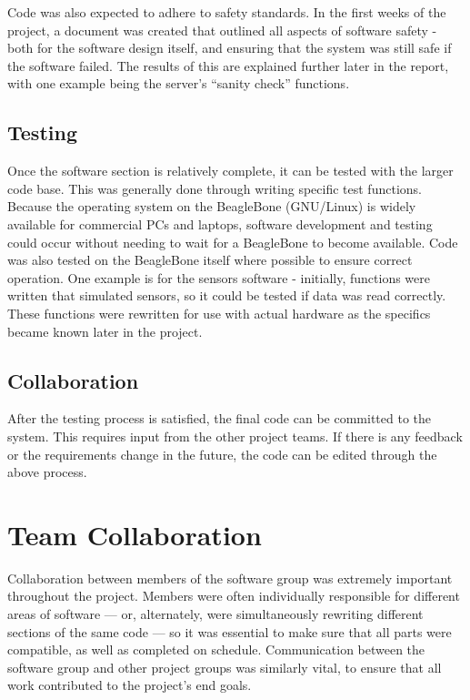 Code was also expected to adhere to safety standards. In the first weeks of the project, a document\cite{kruger_safety} was created that outlined all aspects of software safety - both for the software design itself, and ensuring that the system was still safe if the software failed. The results of this are explained further later in the report, with one example being the server's ``sanity check'' functions.

\subsection{Testing}

Once the software section is relatively complete, it can be tested with the larger code base. This was generally done through writing specific test functions. Because the operating system on the BeagleBone (GNU/Linux) is widely available for commercial PCs and laptops, software development and testing could occur without needing to wait for a BeagleBone to become available. Code was also tested on the BeagleBone itself where possible to ensure correct operation. One example is for the sensors software - initially, functions were written that simulated sensors, so it could be tested if data was read correctly. These functions were rewritten for use with actual hardware as the specifics became known later in the project.

\subsection{Collaboration}
After the testing process is satisfied, the final code can be committed to the system. This requires input from the other project teams. If there is any feedback or the requirements change in the future, the code can be edited through the above process.

\section{Team Collaboration}

Collaboration between members of the software group was extremely important throughout the project. Members were often individually responsible for different areas of software --- or, alternately, were simultaneously rewriting different sections of the same code --- so it was essential to make sure that all parts were compatible, as well as completed on schedule. Communication between the software group and other project groups was similarly vital, to ensure that all work contributed to the project's end goals. 

